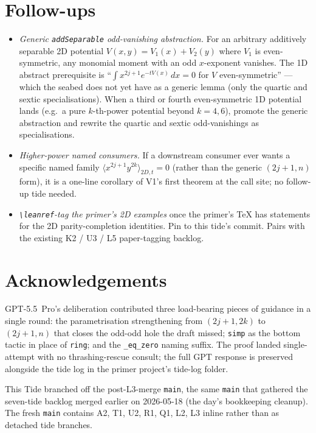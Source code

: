 \documentclass[11pt]{article}
\begin{document}
\section{Follow-ups}

\begin{itemize}[leftmargin=1.5em]
\item \emph{Generic \texttt{addSeparable} odd-vanishing abstraction.}
  For an arbitrary additively separable 2D potential
  $V(x, y) = V_1(x) + V_2(y)$ where $V_1$ is even-symmetric, any
  monomial moment with an odd $x$-exponent vanishes. The 1D abstract
  prerequisite is ``$\int x^{2j+1} e^{-tV(x)}\,dx = 0$ for $V$
  even-symmetric'' --- which the seabed does not yet have as a
  generic lemma (only the quartic and sextic specialisations). When a
  third or fourth even-symmetric 1D potential lands (e.g.\ a pure
  $k$-th-power potential beyond $k = 4, 6$), promote the generic
  abstraction and rewrite the quartic and sextic odd-vanishings as
  specialisations.
\item \emph{Higher-power named consumers.} If a downstream consumer
  ever wants a specific named family
  $\langle x^{2j+1} y^{2k}\rangle_{2D, t} = 0$ (rather than the
  generic $(2j+1, n)$ form), it is a one-line corollary of V1's
  first theorem at the call site; no follow-up tide needed.
\item \emph{\texttt{\textbackslash leanref}-tag the primer's 2D
  examples} once the primer's TeX has statements for the 2D
  parity-completion identities. Pin to this tide's commit. Pairs with
  the existing K2 / U3 / L5 paper-tagging backlog.
\end{itemize}

\section*{Acknowledgements}

GPT-5.5~Pro's deliberation contributed three load-bearing pieces of
guidance in a single round: the parametrisation strengthening from
$(2j+1, 2k)$ to $(2j+1, n)$ that closes the odd-odd hole the draft
missed; \texttt{simp} as the bottom tactic in place of \texttt{ring};
and the \texttt{\_eq\_zero} naming suffix. The proof landed
single-attempt with no thrashing-rescue consult; the full GPT
response is preserved alongside the tide log in the primer project's
tide-log folder.

This Tide branched off the post-L3-merge \texttt{main}, the same
\texttt{main} that gathered the seven-tide backlog merged earlier on
2026-05-18 (the day's bookkeeping cleanup). The fresh \texttt{main}
contains A2, T1, U2, R1, Q1, L2, L3 inline rather than as detached
tide branches.
\end{document}
